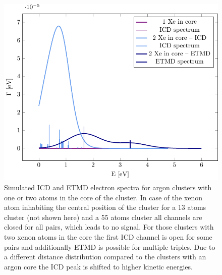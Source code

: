 \begin{figure}[h]
 \centering
 \includegraphics[scale=0.7]{pics/xe_3_in.pdf}
 \caption{Simulated ICD and ETMD electron spectra for argon clusters with
          one or two atoms in the core of the cluster. In case of the xenon
          atom inhabiting the central position of the cluster for a 13 atoms
          cluster (not shown here) and a 55 atoms cluster all channels are closed
          for all pairs, which leads to no signal. For those clusters with two
          xenon atoms in the core the first ICD channel is open for some pairs
          and additionally ETMD is possible for multiple triples. Due to a
          different distance distribution compared to the clusters with an argon
          core the ICD peak is shifted to higher kinetic energies.}
 \label{figure:xe_3_in}
\end{figure}

